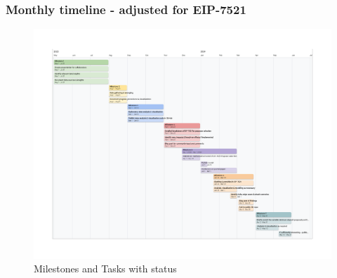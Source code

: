 \documentclass{beamer}
\begin{document}
\frame
{
  \frametitle{Monthly timeline - adjusted for EIP-7521}
	\begin{figure}[htbp]
	\begin{center}
		\includegraphics[width=\textwidth]{images/EFGrantTimeline-adjusted-for-EIP7521_monthly.pdf}
	\caption{Milestones and Tasks with status}
	\label{tasks}
	\end{center}
	\end{figure}

}
\end{document}
